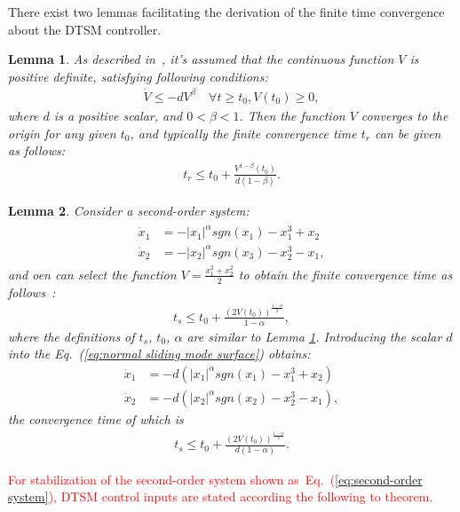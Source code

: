 \documentclass[3p]{elsarticle}
\theoremstyle{plain}
\newtheorem{mylem}{Lemma}
\theoremstyle{remark}
\begin{document}
There exist two lemmas facilitating the derivation of the finite time convergence about the DTSM controller.
\begin{mylem}
As described in~\cite{moulay2006finite}, it's assumed that the continuous function $V$ is positive definite, satisfying following conditions:
\begin{align}
\dot V\le -dV^\beta\quad\forall t\ge t_0, V(t_0)\ge 0,
\end{align}
where $d$ is a positive scalar, and $0<\beta<1$. Then the function $V$ converges to the origin for any given $t_0$, and typically the finite convergence time $t_r$ can be given as follows:
\begin{align}
t_r \le t_0+\frac{V^{1-\beta}(t_0)}{d(1-\beta)}.
\end{align}\label{lemma:1}
\end{mylem}
\begin{mylem}
Consider a second-order system:
\begin{align}
\begin{split}
\dot x_1&=-\vert x_1\vert^\alpha sgn(x_1)-x_1^3+x_2\\
\dot x_2&=-\vert x_2\vert^\alpha sgn(x_3)-x_2^3-x_1,\label{eq:normal sliding mode  surface}
\end{split}
\end{align}
and oen can select the function $V = \frac{x_1^2+x_2^2}{2}$ to obtain the finite convergence time as follows~\cite{moulay2006finite}:
\begin{align}
t_s\le t_0+\frac{(2V(t_0))^{\frac{1-\alpha}{2}}}{1-\alpha},
\end{align}
where the definitions of  $t_s$, $t_0$, $\alpha$ are similar to Lemma \ref{lemma:1}. Introducing the scalar $d$ into the Eq.~(\ref{eq:normal sliding mode  surface}) obtains:
\begin{align}
\dot x_1&=-d(\vert x_1\vert^\alpha sgn(x_1)-x_1^3+x_2)\\
\dot x_2&=-d(\vert x_2\vert^\alpha sgn(x_2)-x_2^3-x_1),\label{eq:more normal sliding mode  surface}
\end{align}
the convergence time of which is
\begin{align}
t_s\le t_0+\frac{(2V(t_0))^{\frac{1-\alpha}{2}}}{d(1-\alpha)}.
\end{align}\label{lemma:2}
\end{mylem}
\textcolor{red}{For stabilization of the second-order system shown as~Eq.~(\ref{eq:second-order system}), DTSM control inputs are stated according the following to theorem.}
\end{document}
